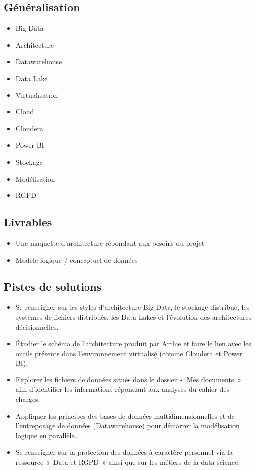 \subsection*{Généralisation}
{}
\begin{itemize}
	\item Big Data
	\item Architecture
	\item Datawarehouse
	\item Data Lake
	\item Virtualisation
	\item Cloud
	\item Cloudera
	\item Power BI
	\item Stockage
	\item Modélisation
	\item RGPD
\end{itemize}

\subsection*{Livrables}
{}
\begin{itemize}
	\item Une maquette d'architecture répondant aux besoins du projet
	\item Modèle logique / conceptuel de données
\end{itemize}

\subsection*{Pistes de solutions}
{}
\begin{itemize}
	\item Se renseigner sur les styles d'architecture Big Data, le stockage distribué, les systèmes de fichiers distribués, les Data Lakes et l'évolution des architectures décisionnelles.
	\item Étudier le schéma de l'architecture produit par Archie et faire le lien avec les outils présents dans l'environnement virtualisé (comme Cloudera et Power BI).
	\item Explorer les fichiers de données situés dans le dossier «~Mes documents~» afin d'identifier les informations répondant aux analyses du cahier des charges.
	\item Appliquer les principes des bases de données multidimensionnelles et de l'entre\-po\-sage de données (Datawarehouse) pour démarrer la modélisation logique en parallèle.
	\item Se renseigner sur la protection des données à caractère personnel via la ressource «~Data et RGPD~» ainsi que sur les métiers de la data science.
\end{itemize}

